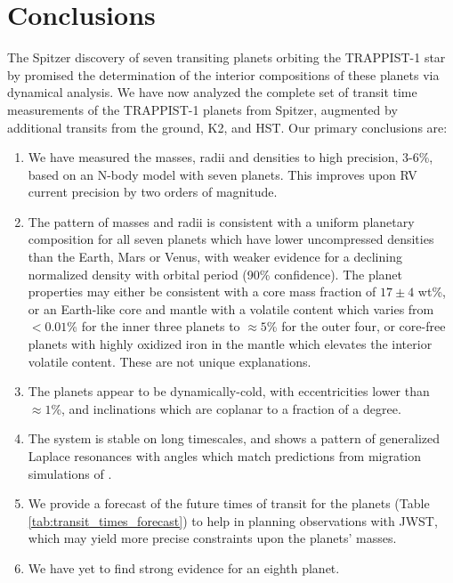 \documentclass[twocolumn]{aastex63}
\begin{document}
\section{Conclusions} \label{sec:conclusions}

The Spitzer discovery of seven transiting planets orbiting the TRAPPIST-1 star by \citet{Gillon2017} promised the determination of the interior compositions of these planets via dynamical analysis.
We have now analyzed the complete set of transit time measurements
of the TRAPPIST-1 planets from  Spitzer, augmented by
additional transits from the ground, K2, and HST.  Our primary conclusions
are:

\begin{enumerate}
    \item  We have measured the masses, radii and densities to high precision, 3-6\%, based on an N-body model with seven planets.  This improves upon RV current precision by two orders of magnitude.
    \item  The pattern of masses and radii is consistent with a uniform planetary composition for all seven planets
    which have lower uncompressed densities than the Earth, Mars or Venus, with weaker evidence for a declining normalized density with orbital period (90\% confidence). The planet properties may either be consistent with 
    a core mass fraction of $17{\pm}4$ wt\%, or an Earth-like core and mantle with a volatile
    content which varies from ${<}0.01$\% for the inner three planets to ${\approx} 5$\%
    for the outer four, or core-free planets with highly oxidized iron in the mantle which elevates the interior volatile content.  These are not unique explanations.
    \item  The planets appear to be dynamically-cold, with eccentricities lower than
    ${\approx }1$\%, and inclinations which are coplanar to a fraction of a degree.
    \item The system is stable on long timescales, and shows a pattern of generalized Laplace resonances with angles which match predictions from migration simulations of \citet{Mah2018}.
    \item We provide a forecast of the future times of transit for the planets (Table \ref{tab:transit_times_forecast}) to help in planning observations with JWST, which may yield more precise constraints upon the planets' masses.
    \item We have yet to find strong evidence for an eighth planet.
\end{enumerate}
\end{document}
